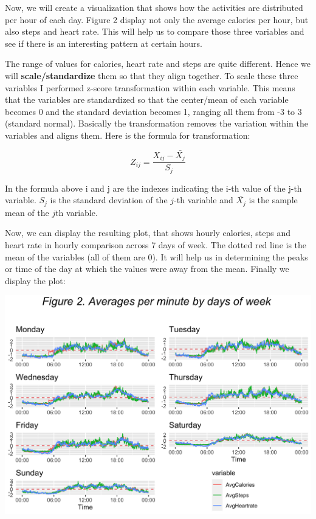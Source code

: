\documentclass[
]{article}
\begin{document}
Now, we will create a visualization that shows how the activities are
distributed per hour of each day. Figure 2 display not only the average
calories per hour, but also steps and heart rate. This will help us to
compare those three variables and see if there is an interesting pattern
at certain hours.

The range of values for calories, heart rate and steps are quite
different. Hence we will \textbf{scale/standardize} them so that they
align together. To scale these three variables I performed z-score
transformation within each variable. This means that the variables are
standardized so that the center/mean of each variable becomes 0 and the
standard deviation becomes 1, ranging all them from -3 to 3 (standard
normal). Basically the transformation removes the variation within the
variables and aligns them. Here is the formula for transformation:

\[Z_{ij} = \frac{X_{ij} -\bar{X_j}}{S_j}\]

In the formula above i and j are the indexes indicating the i-th value
of the j-th variable. \(S_j\) is the standard deviation of the \(j\)-th
variable and \(\bar{X_j}\) is the sample mean of the \(j\)th variable.

Now, we can display the resulting plot, that shows hourly calories,
steps and heart rate in hourly comparison across 7 days of week. The
dotted red line is the mean of the variables (all of them are 0). It
will help us in determining the peaks or time of the day at which the
values were away from the mean. Finally we display the plot:

\begin{center}\includegraphics[width=1.1\linewidth]{./figs/lineplots1} \end{center}
\end{document}
